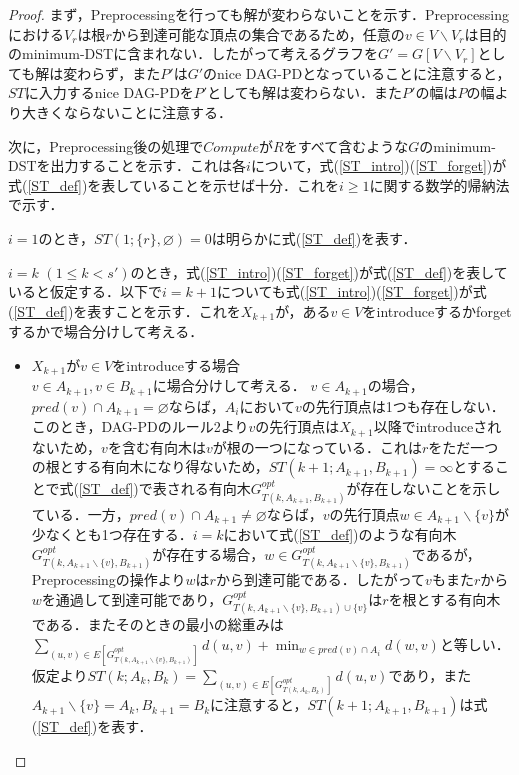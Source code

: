 \documentclass[master]{kuisthesis}		%
\theoremstyle{plain}
\theoremstyle{definition}
\begin{document}
\begin{proof}
    まず，Preprocessingを行っても解が変わらないことを示す．Preprocessingにおける$V_r$は根$r$から到達可能な頂点の集合であるため，任意の$v \in V \backslash V_r$は目的のminimum-DSTに含まれない．したがって考えるグラフを$G' = G[V \backslash V_r]$としても解は変わらず，また$P'$は$G'$のnice DAG-PDとなっていることに注意すると，$ST$に入力するnice DAG-PDを$P'$としても解は変わらない．また$P'$の幅は$P$の幅より大きくならないことに注意する．

    次に，Preprocessing後の処理で$Compute$が$R$をすべて含むような$G$のminimum-DSTを出力することを示す．これは各$i$について，式(\ref{ST_intro})(\ref{ST_forget})が式(\ref{ST_def})を表していることを示せば十分．これを$i \geq 1$に関する数学的帰納法で示す．    
 
    
    $i=1$のとき，$ST(1; \{r\}, \varnothing) = 0$は明らかに式(\ref{ST_def})を表す．
    
    $i=k$ $(1 \leq k < s')$のとき，式(\ref{ST_intro})(\ref{ST_forget})が式(\ref{ST_def})を表していると仮定する．以下で$i = k+1$についても式(\ref{ST_intro})(\ref{ST_forget})が式(\ref{ST_def})を表すことを示す．これを$X_{k+1}$が，ある$v \in V$をintroduceするかforgetするかで場合分けして考える．

    
    \begin{itemize}
        \item $X_{k+1}$が$v \in V$をintroduceする場合 \\
        $v \in A_{k+1}, v \in B_{k+1}$に場合分けして考える．
        $v \in A_{k+1}$の場合，$pred(v) \cap A_{k+1} = \varnothing$ならば，$A_i$において$v$の先行頂点は1つも存在しない．このとき，DAG-PDのルール2より$v$の先行頂点は$X_{k+1}$以降でintroduceされないため，$v$を含む有向木は$v$が根の一つになっている．これは$r$をただ一つの根とする有向木になり得ないため，$ST(k+1; A_{k+1}, B_{k+1}) = \infty$とすることで式(\ref{ST_def})で表される有向木$G^{opt}_{T(k, A_{k+1}, B_{k+1})}$が存在しないことを示している．一方，$pred(v) \cap A_{k+1} \neq \varnothing$ならば，$v$の先行頂点$w \in A_{k+1} \backslash \{v\}$が少なくとも1つ存在する．$i=k$において式(\ref{ST_def})のような有向木 $G^{opt}_{T(k, A_{k+1} \backslash \{v\}, B_{k+1})}$が存在する場合，$w \in G^{opt}_{T(k,A_{k+1} \backslash \{v\}, B_{k+1})}$であるが，Preprocessingの操作より$w$は$r$から到達可能である．したがって$v$もまた$r$から$w$を通過して到達可能であり，$G^{opt}_{T(k, A_{k+1} \backslash \{v\}, B_{k+1}) \cup \{v\}}$は$r$を根とする有向木である．またそのときの最小の総重みは$ \sum_{(u, v) \in E[G^{opt}_{T(k, A_{k+1} \backslash \{v\}, B_{k+1})}]} d(u, v) + \displaystyle \min_{w \in pred(v) \cap A_i} d(w, v)$と等しい．仮定より$ST(k; A_k, B_k) =  \sum_{(u, v) \in E[G^{opt}_{T(k, A_k, B_k)}]} d(u, v)$であり，また$A_{k+1} \backslash \{v\} = A_k, B_{k+1} = B_k$に注意すると，$ST(k+1; A_{k+1}, B_{k+1})$は式(\ref{ST_def})を表す．


\end{itemize}
\end{proof}
\end{document}
